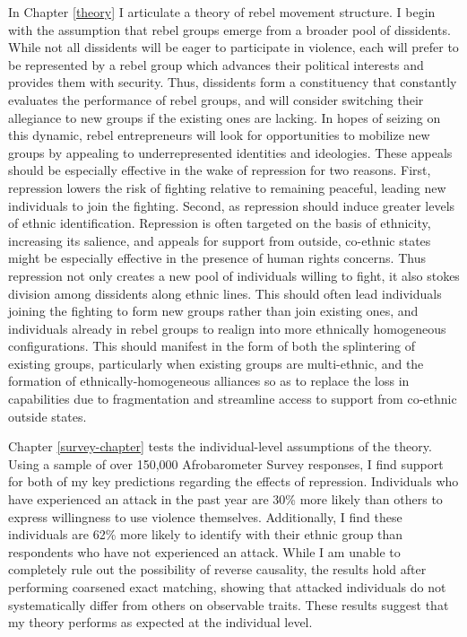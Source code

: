 \documentclass[12pt,]{book}
\theoremstyle{definition}
\theoremstyle{definition}
\theoremstyle{definition}
\theoremstyle{remark}
\begin{document}
In Chapter \ref{theory} I articulate a theory of rebel movement
structure. I begin with the assumption that rebel groups emerge from a
broader pool of dissidents. While not all dissidents will be eager to
participate in violence, each will prefer to be represented by a rebel
group which advances their political interests and provides them with
security. Thus, dissidents form a constituency that constantly evaluates
the performance of rebel groups, and will consider switching their
allegiance to new groups if the existing ones are lacking. In hopes of
seizing on this dynamic, rebel entrepreneurs will look for opportunities
to mobilize new groups by appealing to underrepresented identities and
ideologies. These appeals should be especially effective in the wake of
repression for two reasons. First, repression lowers the risk of
fighting relative to remaining peaceful, leading new individuals to join
the fighting. Second, as repression should induce greater levels of
ethnic identification. Repression is often targeted on the basis of
ethnicity, increasing its salience, and appeals for support from
outside, co-ethnic states might be especially effective in the presence
of human rights concerns. Thus repression not only creates a new pool of
individuals willing to fight, it also stokes division among dissidents
along ethnic lines. This should often lead individuals joining the
fighting to form new groups rather than join existing ones, and
individuals already in rebel groups to realign into more ethnically
homogeneous configurations. This should manifest in the form of both the
splintering of existing groups, particularly when existing groups are
multi-ethnic, and the formation of ethnically-homogeneous alliances so
as to replace the loss in capabilities due to fragmentation and
streamline access to support from co-ethnic outside states.

Chapter \ref{survey-chapter} tests the individual-level assumptions of
the theory. Using a sample of over 150,000 Afrobarometer Survey
responses, I find support for both of my key predictions regarding the
effects of repression. Individuals who have experienced an attack in the
past year are 30\% more likely than others to express willingness to use
violence themselves. Additionally, I find these individuals are 62\%
more likely to identify with their ethnic group than respondents who
have not experienced an attack. While I am unable to completely rule out
the possibility of reverse causality, the results hold after performing
coarsened exact matching, showing that attacked individuals do not
systematically differ from others on observable traits. These results
suggest that my theory performs as expected at the individual level.
\end{document}
